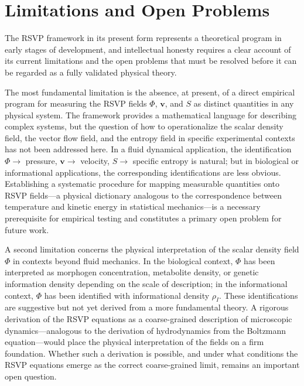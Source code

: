 \documentclass[12pt]{article}
\begin{document}
\section{Limitations and Open Problems}
\label{sec:limitations}

The RSVP framework in its present form represents a theoretical program in early stages of development, and intellectual honesty requires a clear account of its current limitations and the open problems that must be resolved before it can be regarded as a fully validated physical theory.

The most fundamental limitation is the absence, at present, of a direct empirical program for measuring the RSVP fields $\Phi$, $\mathbf{v}$, and $S$ as distinct quantities in any physical system. The framework provides a mathematical language for describing complex systems, but the question of how to operationalize the scalar density field, the vector flow field, and the entropy field in specific experimental contexts has not been addressed here. In a fluid dynamical application, the identification $\Phi \to$ pressure, $\mathbf{v} \to$ velocity, $S \to$ specific entropy is natural; but in biological or informational applications, the corresponding identifications are less obvious. Establishing a systematic procedure for mapping measurable quantities onto RSVP fields---a physical dictionary analogous to the correspondence between temperature and kinetic energy in statistical mechanics---is a necessary prerequisite for empirical testing and constitutes a primary open problem for future work.

A second limitation concerns the physical interpretation of the scalar density field $\Phi$ in contexts beyond fluid mechanics. In the biological context, $\Phi$ has been interpreted as morphogen concentration, metabolite density, or genetic information density depending on the scale of description; in the informational context, $\Phi$ has been identified with informational density $\rho_I$. These identifications are suggestive but not yet derived from a more fundamental theory. A rigorous derivation of the RSVP equations as a coarse-grained description of microscopic dynamics---analogous to the derivation of hydrodynamics from the Boltzmann equation---would place the physical interpretation of the fields on a firm foundation. Whether such a derivation is possible, and under what conditions the RSVP equations emerge as the correct coarse-grained limit, remains an important open question.
\end{document}
